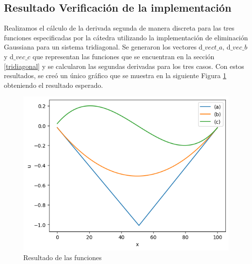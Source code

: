 \fi


\iffalse
    \subsection{Resultado Verificación de la implementación}
    \label{resultados derivada}
    Realizamos el cálculo de la derivada segunda de manera discreta para las tres funciones especificadas por la cátedra utilizando la implementación de eliminación Gaussiana para un sistema tridiagonal.
    Se generaron los vectores d$\_vect\_a$, d$\_vec\_b$  y d$\_vec\_c$ que representan las funciones que se encuentran en la sección \ref{tridiagonal} y se calcularon las segundas derivadas para los tres casos.
    Con estos resultados, se creó un único gráfico que se muestra en la siguiente Figura \ref{result_laplaciano} obteniendo el resultado esperado.

    \begin{figure}[H]
    \centerline{\includegraphics[scale=0.45]{./img/resultado_tridiag}}
    \caption{Resultado de las funciones}
    \label{result_laplaciano}
    \end{figure}

